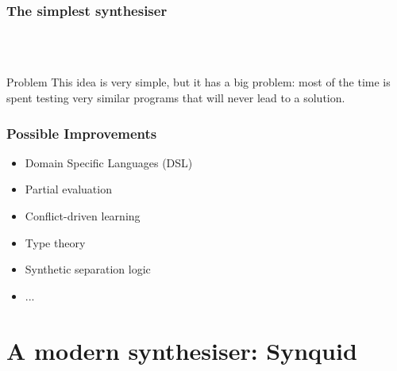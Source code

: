\documentclass{beamer}
\begin{document}
\begin{frame}
    \frametitle{The simplest synthesiser}

	\centering
    ~\\~\\

	\pause

	\begin{alertblock}{Problem}
		This idea is very simple, but it has a big problem: most of the time is spent
		testing very similar programs that will never lead to a solution.
	\end{alertblock}

\end{frame}

\begin{frame}
	\frametitle{Possible Improvements}

	\begin{itemize}
		\item Domain Specific Languages (DSL)
		\item Partial evaluation
		\item Conflict-driven learning
		\item Type theory
		\item Synthetic separation logic
		\item ...
	\end{itemize}

\end{frame}

\section{A modern synthesiser: Synquid}
\end{document}
